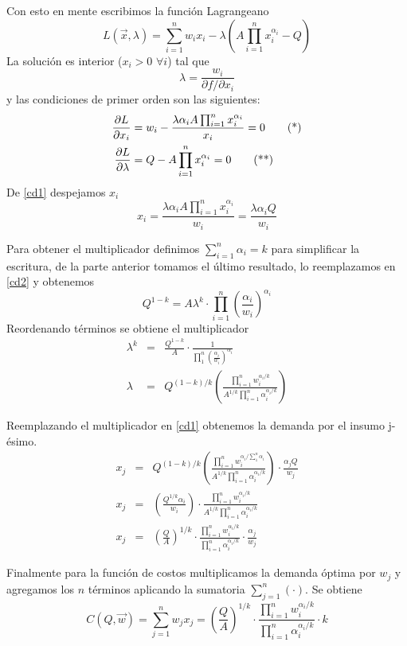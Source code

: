 \begin{ejemplo}
Con esto en mente escribimos la funci\'on Lagrangeano
$$ L(\vec{x},\lambda) = \sum_{i=1}^n w_i x_i - \lambda \left(A\prod_{i=1}^n x_i^{\alpha_i} - Q\right)$$
La soluci\'on es interior ($x_i >  0$ $\forall i$) tal que 
$$\lambda = \frac{w_i}{\partial f / \partial x_i}$$
y las condiciones de primer orden son las siguientes:
	\begin{align}
	\label{cd1} \frac{\partial L}{\partial x_i} &= w_i - \frac{\lambda  \alpha_i A\prod_{i=1}^n x_i^{\alpha_i}}{x_i} = 0 \tag{*} \\
	\label{cd2} \frac{\partial L}{\partial \lambda} &= Q - A\prod_{i=1}^n x_i^{\alpha_i} = 0 \tag{**}
	\end{align}
De \eqref{cd1} despejamos $x_i$
$$x_i = \frac{\lambda \alpha_i A\prod_{i=1}^n x_i^{\alpha_i}}{w_i} = \frac{\lambda \alpha_i Q}{w_i}$$

Para obtener el multiplicador definimos $\sum_{i=1}^n \alpha_i = k$ para simplificar la escritura, de la parte anterior tomamos el \'ultimo resultado, lo reemplazamos en \eqref{cd2} y obtenemos
$$Q^{1 - k}=A\lambda^{k} \cdot \prod_{i=1}^n \left( \frac{\alpha_i}{w_i}\right)^{\alpha_i}$$
Reordenando t\'erminos se obtiene el multiplicador
\begin{eqnarray*}
\lambda^{k} &=& \frac{Q^{1 - k}}{A} \cdot \frac{1}{\prod_1^n \left( \frac{\alpha_i}{w_i}\right)^{\alpha_i}} \\
\lambda &=& Q^{(1-k)/k} \left( \frac{\prod_{i=1}^n w_i^{\alpha_i / k}}{A^{1/k} \prod_{i=1}^n \alpha_i^{\alpha_i / k}} \right)
\end{eqnarray*}

Reemplazando el multiplicador en \eqref{cd1} obtenemos la demanda por el insumo j-\'esimo.
\begin{eqnarray*}
x_j &=& Q^{(1-k)/k} \left( \frac{\prod_{i=1}^n w_i^{\alpha_i / \sum_1^n \alpha_i}}{A^{1/k} 	\prod_{i=1}^n \alpha_i^{\alpha_i / k}} \right) \cdot \frac{\alpha_j Q}{w_j} \\
x_j &=& \left( \frac{Q^{1/k} \alpha_i}{w_i} \right)\cdot \frac{\prod_{i=1}^n w_i^{\alpha_i/k}}				{A^{1/k} \prod_{i=1}^n \alpha_i^{\alpha_i/k}} \\
x_j &=& \left( \frac{Q}{A}\right)^{1/k} \cdot \frac{\prod_{i=1}^n w_i^{\alpha_i/k}}{\prod_{i=1}^n 		\alpha_i^{\alpha_i/k}}\cdot \frac{\alpha_j}{w_j}
\end{eqnarray*}

Finalmente para la funci\'on de costos multiplicamos la demanda \'optima por $w_j$ y agregamos los $n$ t\'erminos aplicando la sumatoria $\sum_{j=1}^n (\cdot)$. Se obtiene
$$ C(Q,\vec{w}) = \sum_{j=1}^n w_j x_j = \left( \frac{Q}{A}\right)^{1/k} \cdot \frac{\prod_{i=1}^n w_i^{\alpha_i/k}}{\prod_{i=1}^n \alpha_i^{\alpha_i/k}} \cdot k $$
\end{ejemplo}

